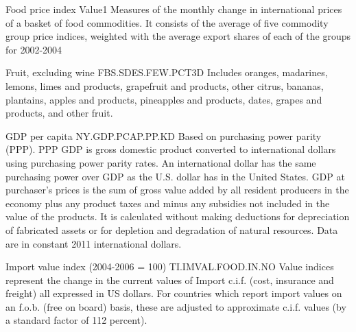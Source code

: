 \begin{MetadataCollection}
\begin{metadata}{ Food price index }{ Value1 }
Measures of the monthly change in international prices of a basket of food commodities. It consists of the average of five commodity group price indices, weighted with the average export shares of each of the groups for 2002-2004 
\end{metadata}

\begin{metadata}{ Fruit, excluding wine }{ FBS.SDES.FEW.PCT3D }
Includes oranges, madarines, lemons, limes and products, grapefruit and products, other citrus, bananas, plantains, apples and products, pineapples and products, dates, grapes and products, and other fruit. 
\end{metadata}

\begin{metadata}{ GDP per capita }{ NY.GDP.PCAP.PP.KD }
Based on purchasing power parity (PPP). PPP GDP is gross domestic product converted to international dollars using purchasing power parity rates. An international dollar has the same purchasing power over GDP as the U.S. dollar has in the United States. GDP at purchaser's prices is the sum of gross value added by all resident producers in the economy plus any product taxes and minus any subsidies not included in the value of the products. It is calculated without making deductions for depreciation of fabricated assets or for depletion and degradation of natural resources. Data are in constant 2011 international dollars. 
\end{metadata}

\begin{metadata}{ Import value index (2004-2006 = 100) }{ TI.IMVAL.FOOD.IN.NO }
Value indices represent the change in the current values of Import c.i.f. (cost, insurance and freight) all expressed in US dollars. For countries which report import values on an f.o.b. (free on board) basis, these are adjusted to approximate c.i.f. values (by a standard factor of 112 percent). 
\end{metadata}


\end{MetadataCollection}
